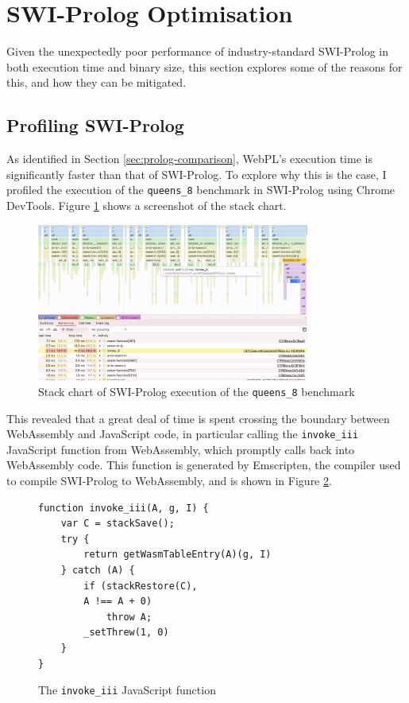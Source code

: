 \section{SWI-Prolog Optimisation}

\label{sec:swi-prolog-optimisation}

Given the unexpectedly poor performance of industry-standard SWI-Prolog in both execution time and binary size, this section explores some of the reasons for this, and how they can be mitigated.

\subsection{Profiling SWI-Prolog}

As identified in Section \ref{sec:prolog-comparison}, WebPL's execution time is significantly faster than that of SWI-Prolog. To explore why this is the case, I profiled the execution of the \texttt{queens\_8} benchmark in SWI-Prolog using Chrome DevTools. Figure \ref{fig:swi-prolog-profile} shows a screenshot of the stack chart.

\begin{figure}[H]
\centering
\includegraphics[width=0.8\textwidth]{08evaluation_swiprofiling.png}
\caption{Stack chart of SWI-Prolog execution of the \texttt{queens\_8} benchmark}
\label{fig:swi-prolog-profile}
\end{figure}

This revealed that a great deal of time is spent crossing the boundary between WebAssembly and JavaScript code, in particular calling the \texttt{invoke\_iii} JavaScript function from WebAssembly, which promptly calls back into WebAssembly code. This function is generated by Emscripten, the compiler used to compile SWI-Prolog to WebAssembly, and is shown in Figure \ref{fig:invoke-iii}.

\begin{figure}[H]
\centering
\begin{verbatim}
function invoke_iii(A, g, I) {
    var C = stackSave();
    try {
        return getWasmTableEntry(A)(g, I)
    } catch (A) {
        if (stackRestore(C),
        A !== A + 0)
            throw A;
        _setThrew(1, 0)
    }
}
\end{verbatim}
\caption{The \texttt{invoke\_iii} JavaScript function}
\label{fig:invoke-iii}
\end{figure}

